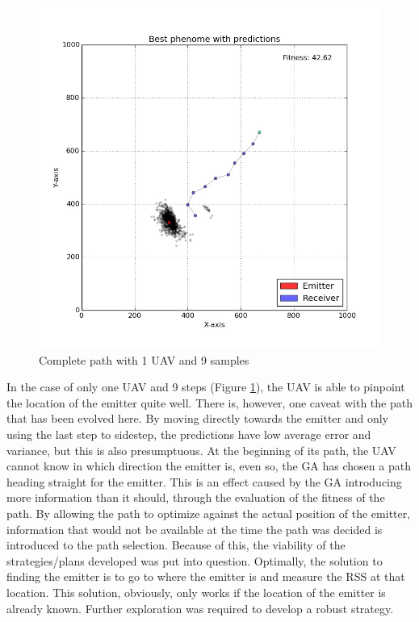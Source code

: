 \documentclass[10pt,a4paper]{book}
\begin{document}
\begin{figure}[H]
\centering
\includegraphics[width=120mm]{uav1steps9.jpg}
\caption{Complete path with 1 \gls{UAV} and 9 samples}
\label{completepath_uav1_step9}
\end{figure}


In the case of only one \gls{UAV} and 9 steps (Figure \ref{completepath_uav1_step9}), the \gls{UAV} is able to pinpoint the location of the emitter quite well. There is, however, one caveat with the path that has been evolved here. By moving directly towards the emitter and only using the last step to sidestep, the predictions have low average error and variance, but this is also presumptuous. At the beginning of its path, the \gls{UAV} cannot know in which direction the emitter is, even so, the \gls{GA} has chosen a path heading straight for the emitter. This is an effect caused by the \gls{GA} introducing more information than it should, through the evaluation of the fitness of the path. By allowing the path to optimize against the actual position of the emitter, information that would not be available at the time the path was decided is introduced to the path selection. Because of this, the viability of the strategies/plans developed was put into question. Optimally, the solution to finding the emitter is to go to where the emitter is and measure the \gls{RSS} at that location. This solution, obviously, only works if the location of the emitter is already known. Further exploration was required to develop a robust strategy. 
\end{document}
